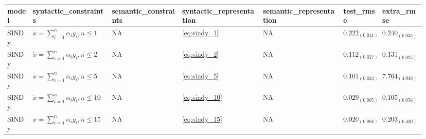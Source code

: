 \begin{tabular}{lllllll}
\toprule
model & syntactic_constraints & semantic_constraints & syntactic_representation & semantic_representation & test_rmse & extra_rmse \\
\midrule
SINDy & $\dot{x}=\sum_{i=1}^n \alpha_i g_i, n \leq 1$ & NA & \cref{eq:sindy_1} & NA & $0.222_{(0.041)}$ & $0.240_{(0.035)}$ \\
SINDy & $\dot{x}=\sum_{i=1}^n \alpha_i g_i, n \leq 2$ & NA & \cref{eq:sindy_2} & NA & $0.112_{(0.027)}$ & $0.131_{(0.025)}$ \\
SINDy & $\dot{x}=\sum_{i=1}^n \alpha_i g_i, n \leq 5$ & NA & \cref{eq:sindy_5} & NA & $0.101_{(0.023)}$ & $7.764_{(4.938)}$ \\
SINDy & $\dot{x}=\sum_{i=1}^n \alpha_i g_i, n \leq 10$ & NA & \cref{eq:sindy_10} & NA & $0.029_{(0.005)}$ & $0.105_{(0.056)}$ \\
SINDy & $\dot{x}=\sum_{i=1}^n \alpha_i g_i, n \leq 15$ & NA & \cref{eq:sindy_15} & NA & $0.020_{(0.004)}$ & $0.203_{(0.430)}$ \\
\bottomrule
\end{tabular}
